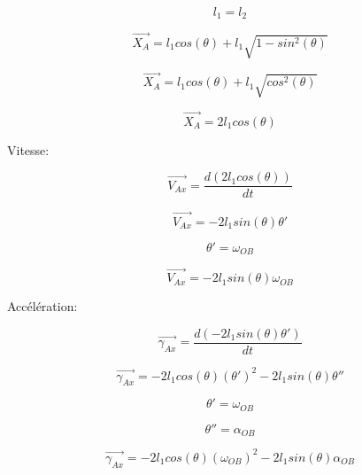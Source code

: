 \documentclass{article}
\begin{document}
\begin{equation}
l_1 = l_2
\end{equation}

\begin{equation}
\overrightarrow{X_A} = l_1cos(\theta)+l_1\sqrt{1-sin^2(\theta)}
\end{equation}

\begin{equation}
\overrightarrow{X_A} = l_1cos(\theta)+l_1\sqrt{cos^2(\theta)}
\end{equation}

\begin{equation}
\overrightarrow{X_A} = 2l_1cos(\theta)
\end{equation}

\noindent Vitesse:

\begin{equation}
\overrightarrow{V_{Ax}} = \frac{d(2l_1cos(\theta))}{dt}
\end{equation}

\begin{equation}
\overrightarrow{V_{Ax}} = -2l_1sin(\theta)\theta'
\end{equation}

\begin{equation}
\theta' = \omega_{OB}
\end{equation}

\begin{equation}
\overrightarrow{V_{Ax}} = -2l_1sin(\theta)\omega_{OB}
\end{equation}

\newpage
\noindent Accélération:

\begin{equation}
\overrightarrow{\gamma_{Ax}} = \frac{d(-2l_1sin(\theta)\theta')}{dt}
\end{equation}

\begin{equation}
\overrightarrow{\gamma_{Ax}} = -2l_1cos(\theta)(\theta')^2-2l_1sin(\theta)\theta''
\end{equation}

\begin{equation}
\theta' = \omega_{OB}
\end{equation}

\begin{equation}
\theta'' = \alpha_{OB}
\end{equation}

\begin{equation}
\overrightarrow{\gamma_{Ax}} = -2l_1cos(\theta)(\omega_{OB})^2-2l_1sin(\theta)\alpha_{OB}
\end{equation}
\end{document}
